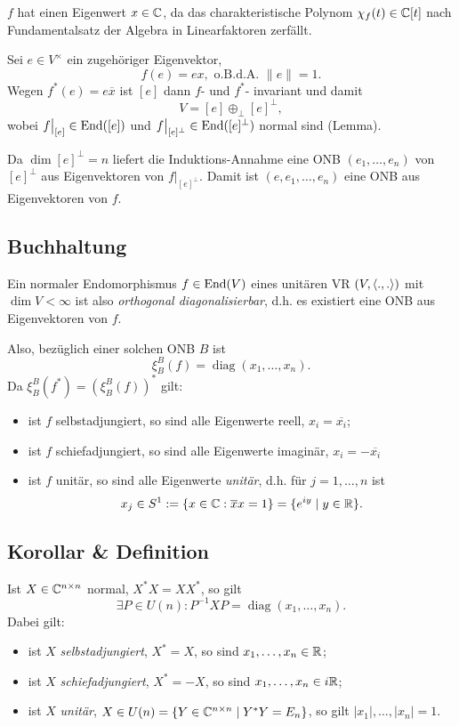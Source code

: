 	$ f $ hat einen Eigenwert $ x\in \mathbb{C} $, da das charakteristische Polynom $ \chi_f(t)\in \mathbb{C}[t] $ nach Fundamentalsatz der Algebra in Linearfaktoren zerfällt.
	
	Sei $ e\in V^\times $ ein zugehöriger Eigenvektor,
		\[ f(e)=ex, \text{ o.B.d.A. } \|e\| = 1. \]
	Wegen $ f^*(e)=e\overline x $ ist $ [e] $ dann $ f $- und $ f^* $- invariant und damit
		\[ V=[e] \oplus_\perp [e]^\perp, \]
	wobei $ f\big|_{[e]}\in \operatorname{End}([e]) $ und $ f\big|_{[e]^\perp}\in \operatorname{End}([e]^\perp) $ normal sind (Lemma).
	
	Da $ \dim [e]^\perp = n$ liefert die Induktions-Annahme eine ONB $ (e_1,\dots,e_n) $ von $ [e]^\perp $ aus Eigenvektoren von $ f\big|_{[e]^\perp} $. Damit ist $ (e,e_1,\dots,e_n) $ eine ONB aus Eigenvektoren von $ f $.

\subsection{Buchhaltung}
	Ein normaler Endomorphismus $ f\in \operatorname{End}(V) $ eines unitären VR $ (V,\langle .,. \rangle) $ mit $ \dim V < \infty $ ist also \emph{orthogonal diagonalisierbar}, d.h. es existiert eine ONB aus Eigenvektoren von $ f $.
	
	Also, bezüglich einer solchen ONB $ B $ ist
		\[ \xi_B^B(f) = \operatorname{diag}(x_1,\dots,x_n). \]
	Da $ \xi_B^B(f^*) = (\xi_B^B(f))^* $ gilt:
		\begin{itemize}
			\item ist $ f $ selbstadjungiert, so sind alle Eigenwerte reell, $ x_i = \overline{x_i} $;
			\item ist $ f $ schiefadjungiert, so sind alle Eigenwerte imaginär, $ x_i = -\overline{x_i} $
			\item ist $ f $ unitär, so sind alle Eigenwerte \emph{unitär}, d.h. für $ j=1,\dots,n $ ist
				\[ x_j\in S^1 := \{x\in \mathbb{C}:\overline{x}x = 1\} = \{e^{iy}\mid y\in \mathbb{R}\}. \]
		\end{itemize}

\subsection{Korollar \& Definition}	
\begin{Korollar}[]
	Ist $ X\in \mathbb{C}^{n\times n} $ normal, $ X^*X = XX^* $, so gilt
		\[ \exists P\in U(n): P^{-1}XP=\operatorname{diag}(x_1,\dots,x_n). \]
	Dabei gilt:
		\begin{itemize}
			\item ist $ X $ \emph{selbstadjungiert}, $ X^*=X $, so sind $ x_1,\dots,x_n \in \mathbb{R} $;
			\item ist $ X $ \emph{schiefadjungiert}, $ X^*=-X $, so sind $ x_1,\dots,x_n\in i\mathbb{R} $;
			\item ist $ X $ \emph{unitär}, $ X\in U(n)= \{Y\in \mathbb{C}^{n\times n}\mid Y^*Y=E_n\} $, so gilt $ |x_1|,\dots,|x_n| = 1. $
		\end{itemize}
\end{Korollar}
